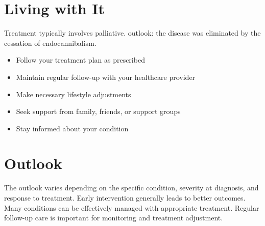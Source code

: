 \section{Living with It}
Treatment typically involves palliative. outlook: the disease was eliminated by the cessation of endocannibalism.

\begin{itemize}[noitemsep]
  \item Follow your treatment plan as prescribed
  \item Maintain regular follow-up with your healthcare provider
  \item Make necessary lifestyle adjustments
  \item Seek support from family, friends, or support groups
  \item Stay informed about your condition
\end{itemize}
\section{Outlook}
The outlook varies depending on the specific condition, severity at diagnosis, and response to treatment. Early intervention generally leads to better outcomes. Many conditions can be effectively managed with appropriate treatment. Regular follow-up care is important for monitoring and treatment adjustment.
